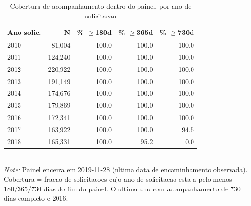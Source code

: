 \begin{table}[htbp]\centering
\caption{Cobertura de acompanhamento dentro do painel, por ano de solicitacao}
\label{tab:R1b_followup}
\small
\begin{tabular}{lrrrr}
\toprule
Ano solic. & N & \% $\geq$180d & \% $\geq$365d & \% $\geq$730d \\
\midrule
2010 & 81,004 & 100.0 & 100.0 & 100.0 \\
2011 & 124,240 & 100.0 & 100.0 & 100.0 \\
2012 & 220,922 & 100.0 & 100.0 & 100.0 \\
2013 & 191,149 & 100.0 & 100.0 & 100.0 \\
2014 & 174,676 & 100.0 & 100.0 & 100.0 \\
2015 & 179,869 & 100.0 & 100.0 & 100.0 \\
2016 & 172,341 & 100.0 & 100.0 & 100.0 \\
2017 & 163,922 & 100.0 & 100.0 & 94.5 \\
2018 & 165,331 & 100.0 & 95.2 & 0.0 \\
\bottomrule
\end{tabular}
\\[3pt]{\footnotesize \textit{Note:} Painel encerra em 2019-11-28 (ultima data de encaminhamento observada). Cobertura = fracao de solicitacoes cujo ano de solicitacao esta a pelo menos 180/365/730 dias do fim do painel. O ultimo ano com acompanhamento de 730 dias completo e 2016.}
\end{table}
